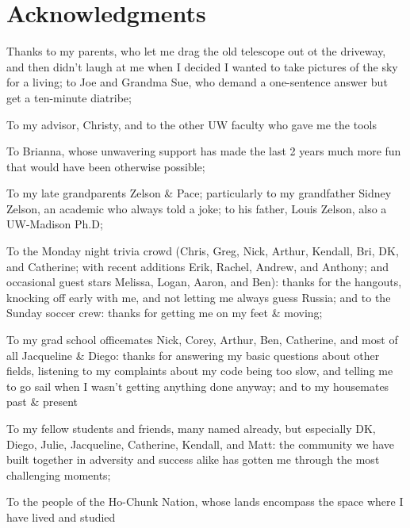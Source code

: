 \chapter*{Acknowledgments}

Thanks to my parents, who let me drag the old telescope out ot the driveway, and then didn't laugh at me when I decided I wanted to take pictures of the sky for a living; to Joe and Grandma Sue, who demand a one-sentence answer but get a ten-minute diatribe;

To my advisor, Christy, and to the other UW faculty who gave me the tools 

To Brianna, whose unwavering support has made the last 2 years much more fun that would have been otherwise possible;

To my late grandparents Zelson \& Pace; particularly to my grandfather Sidney Zelson, an academic who always told a joke; to his father, Louis Zelson, also a UW-Madison Ph.D;

To the Monday night trivia crowd (Chris, Greg, Nick, Arthur, Kendall, Bri, DK, and Catherine; with recent additions Erik, Rachel, Andrew, and Anthony; and occasional guest stars Melissa, Logan, Aaron, and Ben): thanks for the hangouts, knocking off early with me, and not letting me always guess Russia; and to the Sunday soccer crew: thanks for getting me on my feet \& moving;

To my grad school officemates Nick, Corey, Arthur, Ben, Catherine, and most of all Jacqueline \& Diego: thanks for answering my basic questions about other fields, listening to my complaints about my code being too slow, and telling me to go sail when I wasn't getting anything done anyway; and to my housemates past \& present

To my fellow students and friends, many named already, but especially DK, Diego, Julie, Jacqueline, Catherine, Kendall, and Matt: the community we have built together in adversity and success alike has gotten me through the most challenging moments;

To the people of the Ho-Chunk Nation, whose lands encompass the space where I have lived and studied 